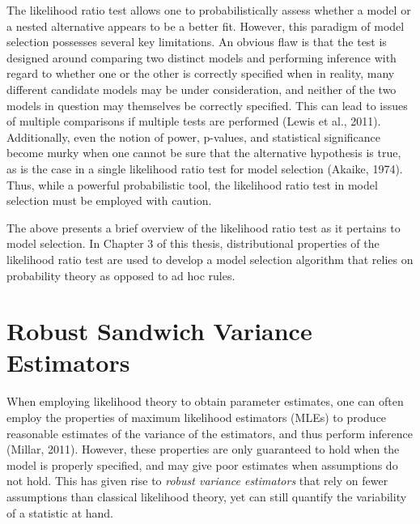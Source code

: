 		The likelihood ratio test allows one to probabilistically assess whether a model or a nested alternative appears to be a better fit. However, this paradigm of model selection possesses
		several key limitations. An obvious flaw is that the test is designed around comparing two distinct models and performing inference with regard to whether one or the other is 
		correctly specified when in reality, many different candidate models may be under consideration, and neither of the two models in question may themselves be correctly specified. 
		This can lead to issues of multiple comparisons if multiple tests are performed (Lewis et al., 2011). Additionally, even the notion of power, p-values, and statistical significance 
		become murky when one cannot be sure that the alternative hypothesis is true, as is the case in a single likelihood ratio test for model selection (Akaike, 1974). Thus, while a powerful
		probabilistic tool, the likelihood ratio test in model selection must be employed with caution.

		The above presents a brief overview of the likelihood ratio test as it pertains to model selection. In Chapter 3 of this thesis, distributional properties of the likelihood ratio test are
		used to develop a model selection algorithm that relies on probability theory as opposed to ad hoc rules.

		\section{Robust Sandwich Variance Estimators}

		When employing likelihood theory to obtain parameter estimates, one can often employ the properties of maximum likelihood estimators (MLEs) to produce reasonable estimates of the variance of the
		estimators, and thus perform inference (Millar, 2011). However, these properties are only guaranteed to hold when the model is properly specified, and may give poor estimates when assumptions
		do not hold. This has given rise to \textit{robust variance estimators} that rely on fewer assumptions than classical likelihood theory, yet can still quantify the variability of a statistic
		at hand.

